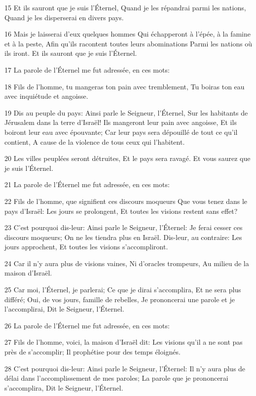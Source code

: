 \par 15 Et ils sauront que je suis l'Éternel, Quand je les répandrai parmi les nations, Quand je les disperserai en divers pays.
\par 16 Mais je laisserai d'eux quelques hommes Qui échapperont à l'épée, à la famine et à la peste, Afin qu'ils racontent toutes leurs abominations Parmi les nations où ils iront. Et ils sauront que je suis l'Éternel.
\par 17 La parole de l'Éternel me fut adressée, en ces mots:
\par 18 Fils de l'homme, tu mangeras ton pain avec tremblement, Tu boiras ton eau avec inquiétude et angoisse.
\par 19 Dis au peuple du pays: Ainsi parle le Seigneur, l'Éternel, Sur les habitants de Jérusalem dans la terre d'Israël! Ils mangeront leur pain avec angoisse, Et ils boiront leur eau avec épouvante; Car leur pays sera dépouillé de tout ce qu'il contient, A cause de la violence de tous ceux qui l'habitent.
\par 20 Les villes peuplées seront détruites, Et le pays sera ravagé. Et vous saurez que je suis l'Éternel.
\par 21 La parole de l'Éternel me fut adressée, en ces mots:
\par 22 Fils de l'homme, que signifient ces discours moqueurs Que vous tenez dans le pays d'Israël: Les jours se prolongent, Et toutes les visions restent sans effet?
\par 23 C'est pourquoi dis-leur: Ainsi parle le Seigneur, l'Éternel: Je ferai cesser ces discours moqueurs; On ne les tiendra plus en Israël. Dis-leur, au contraire: Les jours approchent, Et toutes les visions s'accompliront.
\par 24 Car il n'y aura plus de visions vaines, Ni d'oracles trompeurs, Au milieu de la maison d'Israël.
\par 25 Car moi, l'Éternel, je parlerai; Ce que je dirai s'accomplira, Et ne sera plus différé; Oui, de vos jours, famille de rebelles, Je prononcerai une parole et je l'accomplirai, Dit le Seigneur, l'Éternel.
\par 26 La parole de l'Éternel me fut adressée, en ces mots:
\par 27 Fils de l'homme, voici, la maison d'Israël dit: Les visions qu'il a ne sont pas près de s'accomplir; Il prophétise pour des temps éloignés.
\par 28 C'est pourquoi dis-leur: Ainsi parle le Seigneur, l'Éternel: Il n'y aura plus de délai dans l'accomplissement de mes paroles; La parole que je prononcerai s'accomplira, Dit le Seigneur, l'Éternel.

